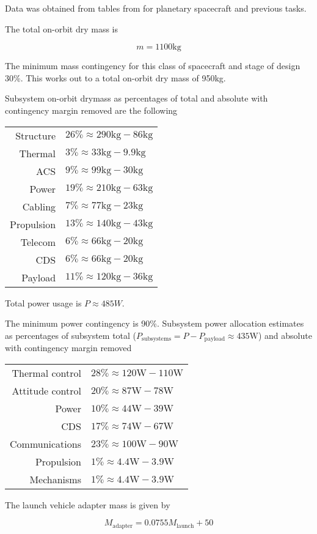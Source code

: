 Data was obtained from tables from
\cite[p. 589,590]{brown2002elements} for planetary spacecraft and
previous tasks.

The total on-orbit dry mass is

\[ m = 1100\mathrm{kg} \]

The minimum mass contingency for this class of spacecraft and stage of
design 30\%. This works out to a total on-orbit dry mass of 950kg.

Subsystem on-orbit drymass as percentages of total and absolute with
contingency margin removed are the following

\begin{center}
\begin{tabular}{rl}
Structure & $26\% \approx 290\mathrm{kg} - 86\mathrm{kg}$ \\
Thermal & $3\% \approx 33\mathrm{kg} - 9.9\mathrm{kg}$ \\
ACS & $9\% \approx 99\mathrm{kg} - 30\mathrm{kg}$ \\
Power & $19\% \approx 210\mathrm{kg} - 63\mathrm{kg}$ \\
Cabling & $7\% \approx 77\mathrm{kg} - 23\mathrm{kg}$ \\
Propulsion & $13\% \approx 140\mathrm{kg} - 43\mathrm{kg}$ \\
Telecom & $6\% \approx 66\mathrm{kg} - 20\mathrm{kg}$ \\
CDS & $6\% \approx 66\mathrm{kg} - 20\mathrm{kg}$ \\
Payload & $11\% \approx 120\mathrm{kg} - 36\mathrm{kg}$ \\
\end{tabular}
\end{center}

Total power usage is $P \approx 485{W}$.

The minimum power contingency is 90\%. Subsystem power allocation
estimates as percentages of subsystem total ($P_\mathrm{subsystems} =
P - P_\mathrm{payload} \approx 435\mathrm{W}$) and absolute with
contingency margin removed

\begin{center}
\begin{tabular}{rl}
Thermal control & $28\% \approx 120\mathrm{W} - 110\mathrm{W}$ \\
Attitude control & $20\% \approx 87\mathrm{W} - 78\mathrm{W}$ \\
Power & $10\% \approx 44\mathrm{W} - 39\mathrm{W}$ \\
CDS & $17\% \approx 74\mathrm{W} - 67\mathrm{W}$ \\
Communications & $23\% \approx 100\mathrm{W} - 90\mathrm{W}$ \\
Propulsion & $1\% \approx 4.4\mathrm{W} - 3.9\mathrm{W}$ \\
Mechanisms & $1\% \approx 4.4\mathrm{W} - 3.9\mathrm{W}$ \\
\end{tabular}
\end{center}

The launch vehicle adapter mass is given by

\[ M_{\mathrm{adapter}} = 0.0755 M_{\mathrm{launch}} + 50 \]

